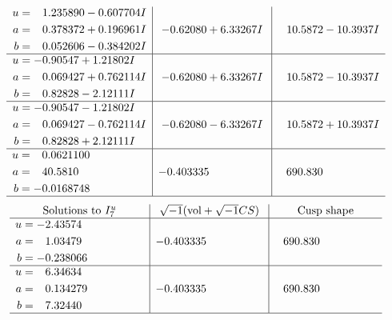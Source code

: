 \documentclass[1p]{elsarticle_modified}
\theoremstyle{definition}
\newcommand{\I}{\sqrt{-1}}
\begin{document}
$$\begin{array}{c|c|c}
\begin{aligned}
u &= \phantom{-}1.235890 - 0.607704 I \\
a &= \phantom{-}0.378372 + 0.196961 I \\
b &= \phantom{-}0.052606 - 0.384202 I\end{aligned}
 & -0.62080 + 6.33267 I & \phantom{-}10.5872 - 10.3937 I \\ \hline\begin{aligned}
u &= -0.90547 + 1.21802 I \\
a &= \phantom{-}0.069427 + 0.762114 I \\
b &= \phantom{-}0.82828 - 2.12111 I\end{aligned}
 & -0.62080 + 6.33267 I & \phantom{-}10.5872 - 10.3937 I \\ \hline\begin{aligned}
u &= -0.90547 - 1.21802 I \\
a &= \phantom{-}0.069427 - 0.762114 I \\
b &= \phantom{-}0.82828 + 2.12111 I\end{aligned}
 & -0.62080 - 6.33267 I & \phantom{-}10.5872 + 10.3937 I \\ \hline\begin{aligned}
u &= \phantom{-}0.0621100\phantom{ +0.000000I} \\
a &= \phantom{-}40.5810\phantom{ +0.000000I} \\
b &= -0.0168748\phantom{ +0.000000I}\end{aligned}
 & -0.403335\phantom{ +0.000000I} & \phantom{-}690.830\phantom{ +0.000000I}\\
 \hline 
 \end{array}$$\newpage$$\begin{array}{c|c|c}  
\text{Solutions to }I^u_{7}& \I (\text{vol} + \sqrt{-1}CS) & \text{Cusp shape}\\
 \hline 
\begin{aligned}
u &= -2.43574\phantom{ +0.000000I} \\
a &= \phantom{-}1.03479\phantom{ +0.000000I} \\
b &= -0.238066\phantom{ +0.000000I}\end{aligned}
 & -0.403335\phantom{ +0.000000I} & \phantom{-}690.830\phantom{ +0.000000I} \\ \hline\begin{aligned}
u &= \phantom{-}6.34634\phantom{ +0.000000I} \\
a &= \phantom{-}0.134279\phantom{ +0.000000I} \\
b &= \phantom{-}7.32440\phantom{ +0.000000I}\end{aligned}
 & -0.403335\phantom{ +0.000000I} & \phantom{-}690.830\phantom{ +0.000000I}\\
 \hline 
 \end{array}$$\newpage\newpage\renewcommand{\arraystretch}{1}
\end{document}

